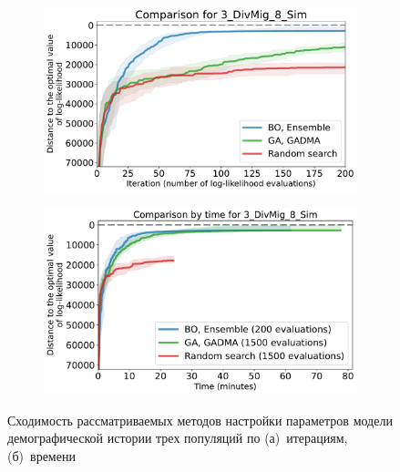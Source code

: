 \begin{figure}[ht]
    \centering
    \begin{subfigure}[b]{0.49\linewidth}
        \centering
        \includegraphics[width=\textwidth]{images_experiments/bo_ga/3_DivMig_8_Sim_bo_ga.pdf}
        \caption{}
        \label{fig:bo_ga_comp_3pops:iteration}
    \end{subfigure}%
    \begin{subfigure}[b]{0.49\linewidth}
        \centering
        \includegraphics[width=\textwidth]{images_experiments/bo_ga/3_DivMig_8_Sim_bo_ga_time.pdf}
        \caption{}
        \label{fig:bo_ga_comp_3pops:time}
    \end{subfigure}
    \caption{Сходимость рассматриваемых методов настройки параметров модели демографической истории трех популяций по (а)~итерациям, (б)~времени}
    \label{fig:bo_ga_comp_3pops}
\end{figure}

